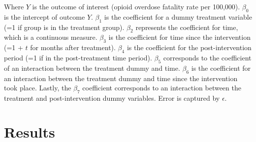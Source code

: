 Where \(Y\) is the outcome of interest (opioid overdose fatality rate per 100,000). \(\beta_0\) is the intercept of outcome \(Y\). \(\beta_1\) is the coefficient for a dummy treatment variable (=1 if group is in the treatment group). \(\beta_2\) represents the coefficient for time, which is a continuous measure. \(\beta_3\) is the coefficient for time since the intervention (=1 + \(t\) for months after treatment). \(\beta_4\) is the coefficient for the post-intervention period (=1 if in the post-treatment time period).  \(\beta_5\) corresponds to the coefficient of an interaction between the treatment dummy and time. \(\beta_6\) is the coefficient for an interaction between the treatment dummy and time since the intervention took place. Lastly, the \(\beta_7\) coefficient corresponds to an interaction between the treatment and post-intervention dummy variables. Error is captured by \(\epsilon\).

\section{Results}
